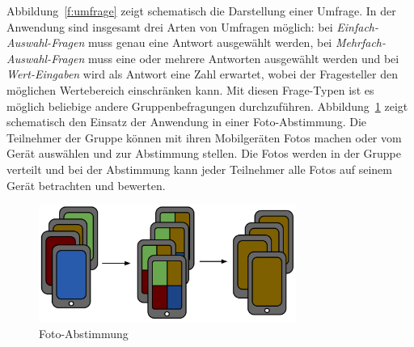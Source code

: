 Abbildung~\ref{f:umfrage} zeigt schematisch die Darstellung einer Umfrage. In der Anwendung sind insgesamt drei Arten von Umfragen möglich: bei \emph{Einfach-Auswahl-Fragen} muss genau eine Antwort ausgewählt werden, bei \emph{Mehrfach-Auswahl-Fragen} muss eine oder mehrere Antworten ausgewählt werden und bei \emph{Wert-Eingaben} wird als Antwort eine Zahl erwartet, wobei der Fragesteller den möglichen Wertebereich einschränken kann. Mit diesen Frage-Typen ist es möglich beliebige andere Gruppenbefragungen durchzuführen. Abbildung~\ref{f:fotoabstimmung} zeigt schematisch den Einsatz der Anwendung in einer Foto-Abstimmung. Die Teilnehmer der Gruppe können mit ihren Mobilgeräten Fotos machen oder vom Gerät auswählen und zur Abstimmung stellen. Die Fotos werden in der Gruppe verteilt und bei der Abstimmung kann jeder Teilnehmer alle Fotos auf seinem Gerät betrachten und bewerten.

\begin{figure}[htb]
\begin{center}
\includegraphics[width=0.75\textwidth]{media/Fotoabstimmung.png}
\end{center}
\caption{Foto-Abstimmung}
\label{f:fotoabstimmung} 
\end{figure}
